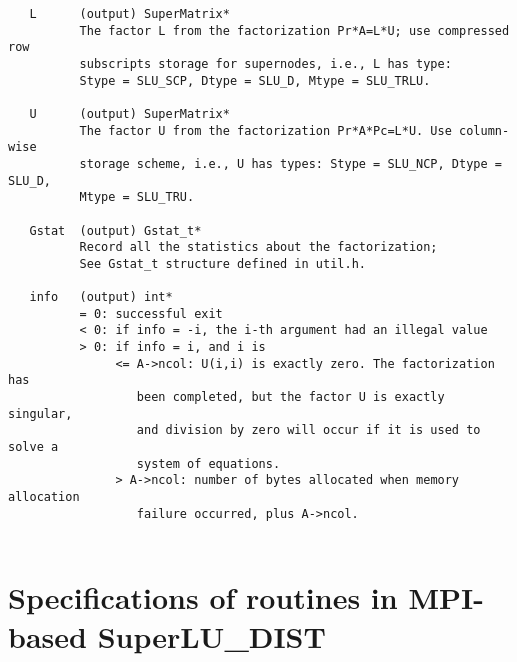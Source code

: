 \begin{verbatim}
   L      (output) SuperMatrix*
          The factor L from the factorization Pr*A=L*U; use compressed row 
          subscripts storage for supernodes, i.e., L has type: 
          Stype = SLU_SCP, Dtype = SLU_D, Mtype = SLU_TRLU.
  
   U      (output) SuperMatrix*
          The factor U from the factorization Pr*A*Pc=L*U. Use column-wise
          storage scheme, i.e., U has types: Stype = SLU_NCP, Dtype = SLU_D,
          Mtype = SLU_TRU.
  
   Gstat  (output) Gstat_t*
          Record all the statistics about the factorization; 
          See Gstat_t structure defined in util.h.
  
   info   (output) int*
          = 0: successful exit
          < 0: if info = -i, the i-th argument had an illegal value
          > 0: if info = i, and i is
               <= A->ncol: U(i,i) is exactly zero. The factorization has
                  been completed, but the factor U is exactly singular,
                  and division by zero will occur if it is used to solve a
                  system of equations.
               > A->ncol: number of bytes allocated when memory allocation
                  failure occurred, plus A->ncol.
  
\end{verbatim}


\newpage
\chapter{Specifications of routines in MPI-based SuperLU\_DIST}
\label{chap:superlu_dist_spec}

